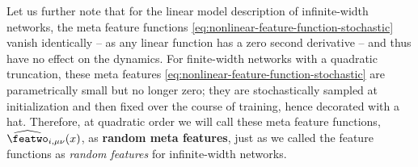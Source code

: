 Let us further note that for the linear model description of infinite-width networks, the meta feature functions \eqref{eq:nonlinear-feature-function-stochastic} vanish identically -- as any linear function has a zero second derivative -- and thus have no effect on the dynamics.
For finite-width networks with a quadratic truncation, these meta features \eqref{eq:nonlinear-feature-function-stochastic} are parametrically small but no longer zero; they are stochastically sampled at initialization and then fixed over the course of training, hence decorated with a hat.
Therefore, at quadratic order we will call these meta feature functions,  $\widehat{\featwo}_{i,\mu\nu}(x)$, as \textbf{random meta features}, just as we called the feature functions as \emph{random features} for infinite-width networks.


